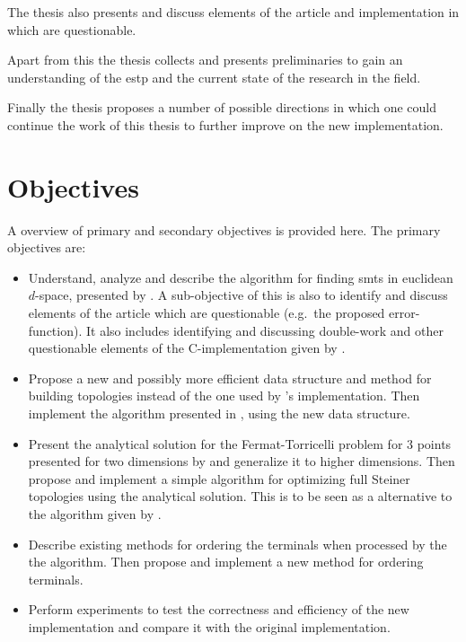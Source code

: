 The thesis also presents and discuss elements of the article and implementation
in \textcite{smith1992} which are questionable.

Apart from this the thesis collects and presents preliminaries to gain an
understanding of the \acl{estp} and the current state of the research in the
field.

Finally the thesis proposes a number of possible directions in which one could
continue the work of this thesis to further improve on the new implementation.

\section{Objectives}
\label{sec:objectives}

A overview of primary and secondary objectives is provided here. The primary
objectives are:
%
\begin{itemize}
\item Understand, analyze and describe the algorithm for finding \aclp{smt} in
  euclidean $d$-space, presented by \textcite{smith1992}. A sub-objective of
  this is also to identify and discuss elements of the article which are
  questionable (e.g.\ the proposed error-function). It also includes identifying
  and discussing double-work and other questionable elements of the C-implementation
  given by \textcite{smith1992}.
\item Propose a new and possibly more efficient data structure and method for building
  topologies instead of the one used by \citeauthor{smith1992}'s implementation.
  Then implement the algorithm presented in \textcite{smith1992}, using the new
  data structure.
\item Present the analytical solution for the Fermat-Torricelli problem for $3$
  points presented for two dimensions by \textcite{uteshev2014} and generalize
  it to higher dimensions. Then propose and implement a simple algorithm for
  optimizing full Steiner topologies using the analytical solution. This is to
  be seen as a alternative to the algorithm given by \textcite{smith1992}.
\item Describe existing methods for ordering the terminals when processed by the
  the algorithm. Then propose and implement a new method for ordering terminals.
\item Perform experiments to test the correctness and efficiency of the new
  implementation and compare it with the original implementation.
\end{itemize}

